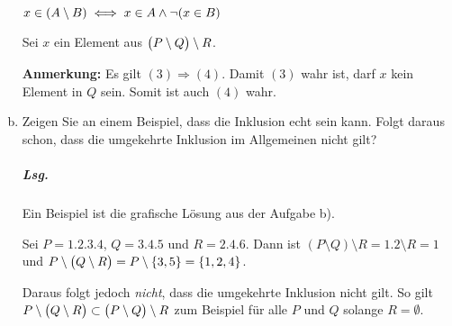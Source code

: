 \documentclass{scrreprt}
\begin{document}
\begin{enumerate}[a)]
  \newpage
  $x \in \qty(A \setminus B) \iff x \in A \land \neg(x \in B)$

  Sei $x$ ein Element aus $\qty\big(P \setminus Q) \setminus R$.
  \setcounter{equation}{0}
  \textbf{Anmerkung:} Es gilt $(3) \Rightarrow (4)$.
  Damit $(3)$ wahr ist, darf $x$ kein Element in $Q$ sein.
  Somit ist auch $(4)$ wahr.

\item Zeigen Sie an einem Beispiel, dass die Inklusion echt sein kann.
  Folgt daraus schon, dass die umgekehrte Inklusion im Allgemeinen nicht gilt?

  \subparagraph{Lsg.} Ein Beispiel ist die grafische Lösung aus der Aufgabe b).

  Sei $P = \qty{1, 2, 3, 4}$, $Q = \qty{3, 4, 5}$ und $R = \qty{2, 4, 6}$.
  Dann ist $(P \setminus Q) \setminus R = \qty{1, 2} \setminus R = \qty{1}$ und
  $P \setminus \qty\big(Q \setminus R) = P \setminus \qty{3, 5} = \qty{1, 2, 4}$.

  Daraus folgt jedoch \emph{nicht}, dass die umgekehrte Inklusion nicht gilt.
  So gilt $P \setminus \qty\big(Q \setminus R) \subset
  \qty\big(P \setminus Q) \setminus R$ zum Beispiel für alle $P$ und $Q$
  solange $R = \emptyset$.
\end{enumerate}
\end{document}
